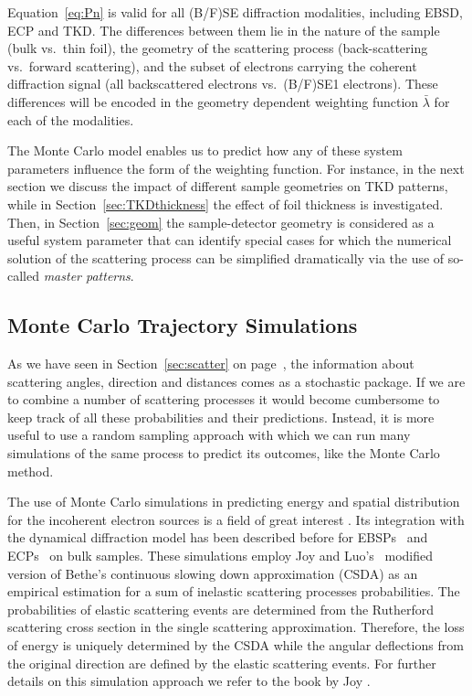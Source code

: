 Equation~\ref{eq:Pn} is valid for all (B/F)SE diffraction modalities, including EBSD, ECP and TKD. The differences between them lie in the nature of the sample (bulk vs.\ thin foil), the geometry of the scattering process (back-scattering vs.\ forward scattering), and the subset of electrons carrying the coherent diffraction signal (all backscattered electrons vs.\ (B/F)SE1 electrons). These differences will be encoded in the geometry dependent weighting function $\bar{\lambda}$ for each of the modalities. 

The Monte Carlo model enables us to predict how any of these system parameters influence the form of the weighting function. For instance, in the next section we discuss the impact of different sample geometries on TKD patterns, while in Section~\ref{sec:TKDthickness} the effect of foil thickness is investigated. Then, in Section~\ref{sec:geom} the sample-detector geometry is considered as a useful system parameter that can identify special cases for which the numerical solution of the scattering process can be simplified dramatically via the use of so-called \textit{master patterns}. 


\subsection{Monte Carlo Trajectory Simulations }
\label{sec:MC}

As we have seen in Section~\ref{sec:scatter} on page~\pageref{sec:scatter}, the information about scattering angles, direction and distances comes as a stochastic package.  If we are to combine a number of scattering processes it would become cumbersome to keep track of all these probabilities and their predictions. Instead, it is more useful to use a random sampling approach with which we can run many simulations of the same process to predict its outcomes, like the Monte Carlo method.


The use of Monte Carlo simulations in predicting energy and spatial distribution for the incoherent electron sources is a field of great interest \cite{Ren98, Tao04}. Its integration with the dynamical diffraction model has been described before for EBSPs~\cite{degraef2013e} and ECPs~\cite{degraef2017k} on bulk samples. These simulations employ Joy and Luo's~\cite{joy1989} modified version of Bethe's continuous slowing down approximation (CSDA) as an empirical estimation for a sum of inelastic scattering processes probabilities. The probabilities of elastic scattering events are determined from the Rutherford scattering cross section in the single scattering approximation. Therefore, the loss of energy is uniquely determined by the CSDA while the angular deflections from the original direction are defined by the elastic scattering events. For further details on this simulation approach we refer to the book by Joy \cite{joy1995a}. 


